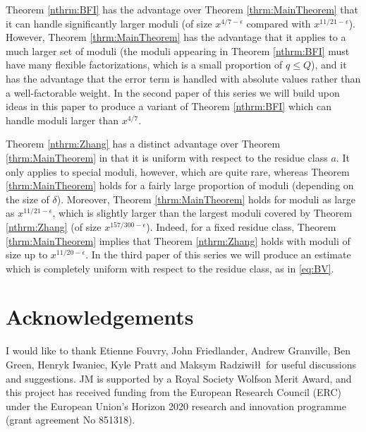 \documentclass[10pt]{amsart}
\theoremstyle{plain}
\numberwithin{equation}{section}
\begin{document}
Theorem \ref{nthrm:BFI} has the advantage over Theorem \ref{thrm:MainTheorem} that it can handle significantly larger moduli (of size $x^{4/7-\epsilon}$ compared with $x^{11/21-\epsilon}$). However, Theorem \ref{thrm:MainTheorem} has the advantage that it applies to a much larger set of moduli (the moduli appearing in Theorem \ref{nthrm:BFI} must have many flexible factorizations, which is a small proportion of $q\le Q$), and it has the advantage that the error term is handled with absolute values rather than a well-factorable weight. In the second paper of this series we will build upon ideas in this paper to produce a variant of Theorem \ref{nthrm:BFI} which can handle moduli larger than $x^{4/7}$.

Theorem \ref{nthrm:Zhang} has a distinct advantage over Theorem \ref{thrm:MainTheorem} in that it is uniform with respect to the residue class $a$. It only applies to special moduli, however, which are quite rare, whereas Theorem \ref{thrm:MainTheorem} holds for a fairly large proportion of moduli (depending on the size of $\delta$). Moreover, Theorem \ref{thrm:MainTheorem} holds for moduli as large as $x^{11/21-\epsilon}$, which is slightly larger than the largest moduli covered by Theorem \ref{nthrm:Zhang} (of size $x^{157/300-\epsilon}$). Indeed, for a fixed residue class, Theorem \ref{thrm:MainTheorem} implies that Theorem \ref{nthrm:Zhang} holds with moduli of size up to $x^{11/20-\epsilon}$. In the third paper of this series we will produce an estimate which is completely uniform with respect to the residue class, as in \eqref{eq:BV}.
%
%
%
%
%
%
%
%
%
%
%
%
%
%
%
%
%
%
%
%
\section{Acknowledgements}

I would like to thank Etienne Fouvry, John Friedlander, Andrew Granville, Ben Green, Henryk Iwaniec, Kyle Pratt and Maksym Radziwi\l\l\, for useful discussions and suggestions. JM is supported by a Royal Society Wolfson Merit Award, and this project has received funding from the European Research Council (ERC) under the European Union’s Horizon 2020 research and innovation programme (grant agreement No 851318).
%
%
%
%
%
%
%
%
%
%
%
%
%
%
%
%
%
%
%
%
\end{document}
